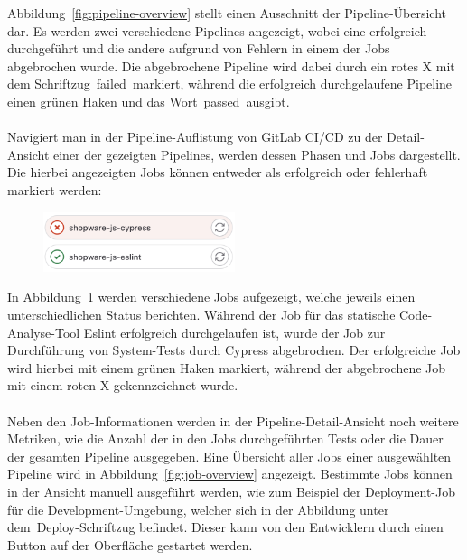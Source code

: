 Abbildung\ \ref{fig:pipeline-overview} stellt einen Ausschnitt der Pipeline-Übersicht dar.
Es werden zwei verschiedene Pipelines angezeigt, wobei eine erfolgreich durchgeführt und die andere
aufgrund von Fehlern in einem der Jobs abgebrochen wurde.
Die abgebrochene Pipeline wird dabei durch ein rotes X mit dem Schriftzug\ \glqq failed\grqq\ markiert, während die
erfolgreich durchgelaufene Pipeline einen grünen Haken und das Wort\ \glqq passed\grqq\ ausgibt.
\\\\
Navigiert man in der Pipeline-Auflistung von GitLab CI/CD zu der Detail-Ansicht einer der gezeigten Pipelines, werden
dessen Phasen und Jobs dargestellt.
Die hierbei angezeigten Jobs können entweder als erfolgreich oder fehlerhaft markiert werden:

\begin{figure}[H]
    \centering
    \includegraphics[width=0.5\textwidth]{images/content/job-status}
    \label{fig:job-status}
\end{figure}

In Abbildung\ \ref{fig:job-status} werden verschiedene Jobs aufgezeigt, welche jeweils einen unterschiedlichen Status
berichten.
Während der Job für das statische Code-Analyse-Tool Eslint erfolgreich durchgelaufen ist, wurde der Job zur
Durchführung von System-Tests durch Cypress abgebrochen.
Der erfolgreiche Job wird hierbei mit einem grünen Haken markiert, während der abgebrochene Job mit einem roten X
gekennzeichnet wurde.
\\\\
Neben den Job-Informationen werden in der Pipeline-Detail-Ansicht noch weitere Metriken, wie die Anzahl der in den Jobs
durchgeführten Tests oder die Dauer der gesamten Pipeline ausgegeben.
Eine Übersicht aller Jobs einer ausgewählten Pipeline wird in Abbildung\ \ref{fig:job-overview} angezeigt.
Bestimmte Jobs können in der Ansicht manuell ausgeführt werden, wie zum Beispiel der Deployment-Job für die
Development-Umgebung, welcher sich in der Abbildung unter dem\ \glqq Deploy\grqq-Schriftzug befindet.
Dieser kann von den Entwicklern durch einen Button auf der Oberfläche gestartet werden.

